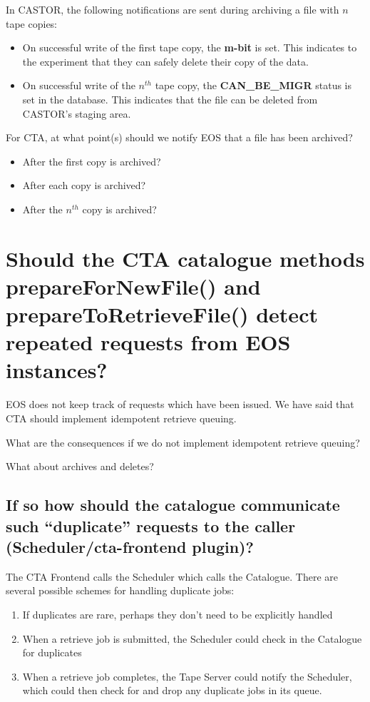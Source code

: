 In CASTOR, the following notifications are sent during archiving a file with $n$ tape copies:
\begin{itemize}
   \item On successful write of the first tape copy, the \textbf{m-bit} is set. This indicates to the experiment that
      they can safely delete their copy of the data.
   \item On successful write of the $n^{th}$ tape copy, the \textbf{CAN\_BE\_MIGR} status is set in the database. This
      indicates that the file can be deleted from CASTOR's staging area.
\end{itemize}

For CTA, at what point(s) should we notify EOS that a file has been archived?
\begin{itemize}
   \item After the first copy is archived?
   \item After each copy is archived?
   \item After the $n^{th}$ copy is archived?
\end{itemize}


\section{Should the CTA catalogue methods prepareForNewFile() and prepareToRetrieveFile() detect repeated requests from
EOS instances?}

EOS does not keep track of requests which have been issued. We have said that CTA should implement idempotent retrieve queuing.

What are the consequences if we do not implement idempotent retrieve queuing?

What about archives and deletes?

\subsection{If so how should the catalogue communicate such ``duplicate'' requests to the caller (Scheduler\slash cta-frontend plugin)?}

The CTA Frontend calls the Scheduler which calls the Catalogue.
There are several possible schemes for handling duplicate jobs:
\begin{enumerate}
   \item If duplicates are rare, perhaps they don't need to be explicitly handled
   \item When a retrieve job is submitted, the Scheduler could check in the Catalogue for duplicates 
   \item When a retrieve job completes, the Tape Server could notify the Scheduler, which could then check for and
      drop any duplicate jobs in its queue.
\end{enumerate}

